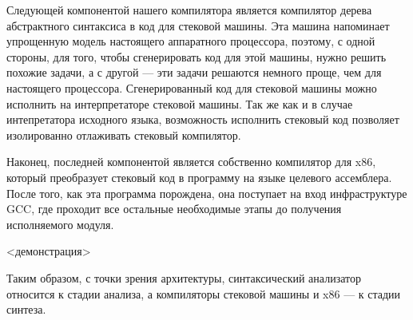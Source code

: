 \documentclass{article}
\begin{document}
Следующей компонентой нашего компилятора является компилятор дерева абстрактного синтаксиса в код для стековой машины.
Эта машина напоминает упрощенную модель настоящего аппаратного процессора, поэтому, с одной стороны, для того, чтобы
сгенерировать код для этой машины, нужно решить похожие задачи, а с другой --- эти задачи решаются немного проще, чем
для настоящего процессора. Сгенерированный код для стековой машины можно исполнить на интерпретаторе стековой машины.
Так же как и в случае интепретатора исходного языка, возможность исполнить стековый код позволяет изолированно
отлаживать стековый компилятор.

Наконец, последней компонентой является собственно компилятор для x86, который преобразует стековый код в
программу на языке целевого ассемблера. После того, как эта программа порождена, она поступает на
вход инфраструктуре GCC, где проходит все остальные необходимые этапы до получения исполняемого модуля.

<демонстрация>

Таким образом, с точки зрения архитектуры, синтаксический анализатор относится к стадии анализа, а компиляторы
стековой машины и x86 --- к стадии синтеза.
\end{document}
